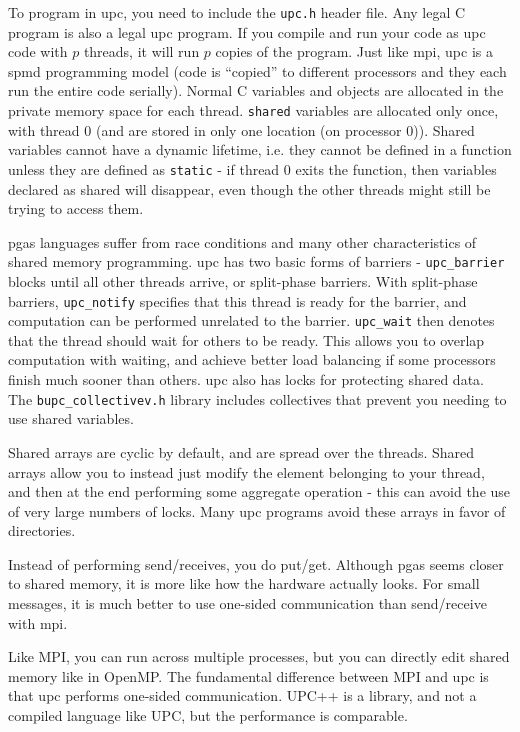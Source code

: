 \documentclass[10pt]{article}
\begin{document}
\begin{flushleft}
To program in \gls{upc}, you need to include the {\tt upc.h} header file. Any legal C program is also a legal \gls{upc} program. If you compile and run your code as \gls{upc} code with \(p\) threads, it will run \(p\) copies of the program. Just like \gls{mpi}, \gls{upc} is a \gls{spmd} programming model (code is ``copied'' to different processors and they each run the entire code serially). Normal C variables and objects are allocated in the private memory space for each thread. {\tt shared} variables are allocated only once, with thread 0 (and are stored in only one location (on processor 0)). Shared variables cannot have a dynamic lifetime, i.e. they cannot be defined in a function unless they are defined as {\tt static} - if thread 0 exits the function, then variables declared as shared will disappear, even though the other threads might still be trying to access them. 

\gls{pgas} languages suffer from race conditions and many other characteristics of shared memory programming. \gls{upc} has two basic forms of barriers - {\tt upc\_barrier} blocks until all other threads arrive, or split-phase barriers. With split-phase barriers, {\tt upc\_notify} specifies that this thread is ready for the barrier, and computation can be performed unrelated to the barrier. {\tt upc\_wait} then denotes that the thread should wait for others to be ready. This allows you to overlap computation with waiting, and achieve better load balancing if some processors finish much sooner than others. \gls{upc} also has locks for protecting shared data. The {\tt bupc\_collectivev.h} library includes collectives that prevent you needing to use shared variables.

Shared arrays are cyclic by default, and are spread over the threads. Shared arrays allow you to instead just modify the element belonging to your thread, and then at the end performing some aggregate operation - this can avoid the use of very large numbers of locks. Many \gls{upc} programs avoid these arrays in favor of directories. 

Instead of performing send/receives, you do put/get. Although \gls{pgas} seems closer to shared memory, it is more like how the hardware actually looks. For small messages, it is much better to use one-sided communication than send/receive with \gls{mpi}.

Like MPI, you can run across multiple processes, but you can directly edit shared memory like in OpenMP.  The fundamental difference between MPI and \gls{upc} is that \gls{upc} performs one-sided communication. UPC++ is a library, and not a compiled language like UPC, but the performance is comparable. 




\end{flushleft}
\end{document}
